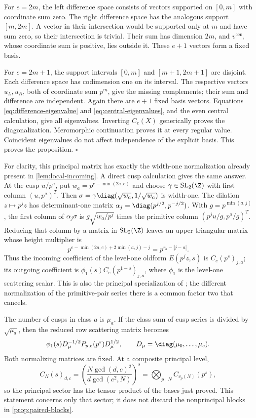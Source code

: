 For \(e=2m\), the left difference space consists of vectors supported
on \([0,m]\) with coordinate sum zero. The right difference space
has the analogous support \([m,2m]\). A vector in their intersection
would be supported only at \(m\) and have sum zero, so their
intersection is trivial. Their sum has dimension \(2m\), and
\(v^{\mathrm{cen}}\), whose coordinate sum is positive, lies outside
it. These \(e+1\) vectors form a fixed basis.

For \(e=2m+1\), the support intervals \([0,m]\) and
\([m+1,2m+1]\) are disjoint. Each difference space has codimension
one on its interval. The respective vectors \(u_L,u_R\), both of
coordinate sum \(p^m\), give the missing complements; their sum
and difference are independent. Again there are \(e+1\) fixed basis
vectors. Equations \eqref{eq:difference-eigenvalue} and
\eqref{eq:central-eigenvalues}, and the even central calculation,
give all eigenvalues. Inverting \(C_e(X)\) generically proves the
diagonalization. Meromorphic continuation proves it at every regular
value. Coincident eigenvalues do not affect independence of the
explicit basis. This proves the proposition. \(\square\)

For clarity, this principal matrix has exactly the width-one
normalization already present in \cref{lem:local-incoming}.
A direct cusp calculation gives the same answer. At the cusp
\(u/p^a\), put \(w_a=p^{e-\min(2a,e)}\) and choose
\(\gamma\in\mathrm{SL}_2(\Z)\) with first column \((u,p^a)^T\).
Then
\(\sigma=\gamma\diag(\sqrt{w_a},1/\sqrt{w_a})\) is width-one.
The dilation \(z\mapsto p^jz\) has determinant-one matrix
\(\alpha_j=\diag(p^{j/2},p^{-j/2})\). With
\(g=p^{\min(a,j)}\), the first column of \(\alpha_j\sigma\)
is \(g\sqrt{w_a/p^j}\) times the primitive column
\((p^ju/g,p^a/g)^T\). Reducing that column by a matrix in
\(\mathrm{SL}_2(\Z)\) leaves an upper triangular matrix whose
height multiplier is
\[
 p^{e-\min(2a,e)+2\min(a,j)-j}
 =p^{r_a-|j-a|}.
\]
Thus the incoming coefficient of the level-one oldform \(E(p^jz,s)\)
is \(C_e(p^s)_{j,a}\); its outgoing coefficient is
\(\phi_1(s)C_e(p^{1-s})_{j,a}\), where \(\phi_1\) is the
level-one scattering scalar. This is also the principal specialization
of \citet[Lemma 2.19]{BookerLeeStrombergsson2020}; the different
normalization of the primitive-pair series there is a common factor
two that cancels.

The number of cusps in class \(a\) is \(\mu_a\). If the class sum
of cusp series is divided by \(\sqrt{\mu_a}\), then the reduced
row scattering matrix becomes
\[
 \phi_1(s)D_\mu^{-1/2}P_{p,e}(p^s)D_\mu^{1/2},
 \qquad D_\mu=\diag(\mu_0,\ldots,\mu_e).
\]
Both normalizing matrices are fixed. At a composite principal level,
\[
 C_N(s)_{d,c}
 =\left(\frac{N\gcd(d,c)^2}{d\gcd(c^2,N)}\right)^s
 =\bigotimes_{p\mid N} C_{v_p(N)}(p^s),
\]
so the principal sector has the tensor product of the bases just
proved. This statement concerns only that sector; it does not
discard the nonprincipal blocks in \cref{prop:paired-blocks}.
